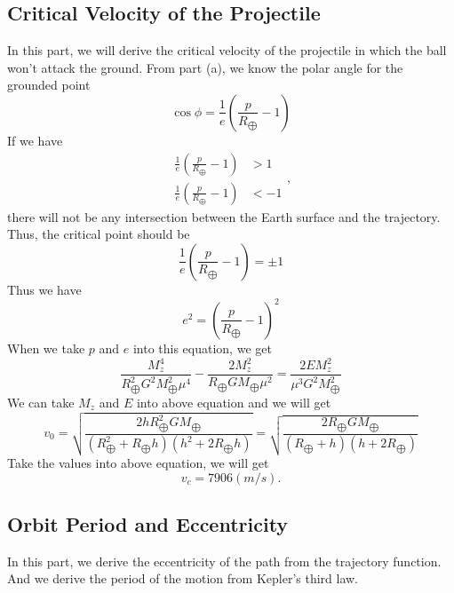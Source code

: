 \documentclass[%
 reprint,
 amsmath,amssymb,
 aps,
]{revtex4-1}
\begin{document}
\subsection{Critical Velocity of the Projectile}
In this part, we will derive the critical velocity of the projectile in which the ball won't attack the ground. 
From part (a), we know the polar angle for the grounded point
\begin{equation*}
    \cos{\phi}=\frac{1}{e}(\frac{p}{R_{\bigoplus}}-1)
\end{equation*}
If we have
\begin{equation*}
\begin{aligned}
\frac{1}{e}(\frac{p}{R_{\bigoplus}}-1)&>1
\\\frac{1}{e}(\frac{p}{R_{\bigoplus}}-1)&<-1
\end{aligned},
\end{equation*}
there will not be any intersection between the Earth surface and the trajectory. Thus, the critical point should be
\begin{equation*}
    \frac{1}{e}(\frac{p}{R_{\bigoplus}}-1)=\pm1
\end{equation*}
Thus we have
\begin{equation*}
    e^2=(\frac{p}{R_{\bigoplus}}-1)^2
\end{equation*}
When we take $p$ and $e$ into this equation, we get
\begin{equation*}
\frac{M_z^4}{R_{\bigoplus}^2G^2M_{\bigoplus}^2\mu^4}
-\frac{2M_z^2}{R_{\bigoplus}GM_{\bigoplus}\mu^2}
=\frac {2EM_z^2}{\mu^3G^2M_{\bigoplus}^2}
\end{equation*}
We can take $M_z$ and $E$ into above equation and we will get
\begin{equation*}
    v_0=\sqrt{\frac{2hR_{\bigoplus}^2GM_{\bigoplus}}{(R_{\bigoplus}^2+R_{\bigoplus}h)(h^2+2R_{\bigoplus}h)}}=\sqrt{\frac{2R_{\bigoplus}GM_{\bigoplus}}{(R_{\bigoplus}+h)(h+2R_{\bigoplus})}}
\end{equation*}
Take the values into above equation, we will get
\begin{equation*}
    v_c=7906(m/s).
\end{equation*}
\subsection{Orbit Period and Eccentricity}
In this part, we derive the eccentricity of the path from the trajectory function. And we derive the period of the motion from Kepler's third law.
\end{document}
